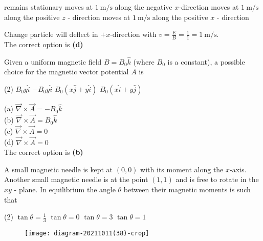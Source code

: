 \begin{enumerate}
\begin{tasks}
	\task[\textbf{A.}] remains stationary
	\task[\textbf{B.}]moves at $1 \mathrm{~m} / \mathrm{s}$ along the negative $x$-direction
	\task[\textbf{C.}]moves at $1 \mathrm{~m} / \mathrm{s}$ along the positive $z$ - direction
	\task[\textbf{D.}] moves at $1 \mathrm{~m} / \mathrm{s}$ along the positive $x$ - direction
\end{tasks}
\begin{answer}
	Change particle will deflect in $+x$-direction with $v=\frac{E}{B}=\frac{1}{1}=1 \mathrm{~m} / \mathrm{s} .$\\
	The correct option is \textbf{(d)}	
\end{answer}
\begin{minipage}{\textwidth}
	\item Given a uniform magnetic field $B=B_{0} \hat{k}$ (where $B_{0}$ is a constant), a possible choice for the magnetic vector potential $A$ is
\end{minipage}
\begin{tasks}(2)
	\task[\textbf{A.}] $B_{0} y \hat{i}$
	\task[\textbf{B.}] $-B_{0} y \hat{i}$
	\task[\textbf{C.}] $B_{0}(x \hat{j}+y \hat{i})$
	\task[\textbf{D.}]$B_{0}(x \hat{i}+y \hat{j})$
\end{tasks}
\begin{answer}
	(a) $\vec{\nabla} \times \vec{A}=-B_{0} \hat{k}$\\
	(b) $\vec{\nabla} \times \vec{A}=B_{0} \hat{k}$\\
	(c) $\vec{\nabla} \times \vec{A}=0$\\
	(d) $\vec{\nabla} \times \vec{A}=0$\\
	The correct option is \textbf{(b)}	
\end{answer}
\begin{minipage}{\textwidth}
	\item A small magnetic needle is kept at $(0,0)$ with its moment along the $x$-axis. Another small magnetic needle is at the point $(1,1)$ and is free to rotate in the $x y$ - plane. In equilibrium the angle $\theta$ between their magnetic moments is such that
\end{minipage}
\begin{tasks}(2)
	\task[\textbf{A.}] $\tan \theta=\frac{1}{3}$
	\task[\textbf{B.}]$\tan \theta=0$
	\task[\textbf{C.}]$\tan \theta=3$
	\task[\textbf{D.}]$\tan \theta=1$
\end{tasks}
\begin{answer}
	\begin{figure}[H]
		\centering
		\texttt{[image: diagram-20211011(38)-crop]}

\end{figure}
\end{answer}
\end{enumerate}
